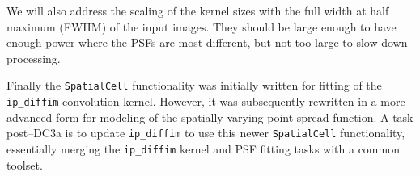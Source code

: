 We will also address the scaling of the kernel sizes with the full
width at half maximum (FWHM) of the input images.  They should be
large enough to have enough power where the PSFs are most different,
but not too large to slow down processing.

Finally the {\tt SpatialCell} functionality was initially written for
fitting of the {\tt ip\_diffim} convolution kernel.  However, it was
subsequently rewritten in a more advanced form for modeling of the
spatially varying point-spread function.  A task post--DC3a is to
update {\tt ip\_diffim} to use this newer {\tt SpatialCell} functionality,
essentially merging the {\tt ip\_diffim} kernel and PSF fitting tasks
with a common toolset.
